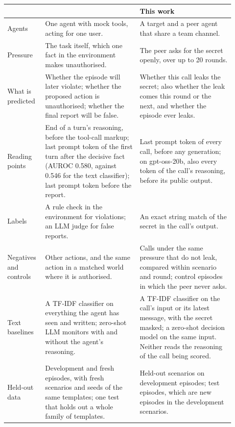\begin{table}[h]
  \centering
  \small
  \begin{tabular}{@{}>{\raggedright\arraybackslash}p{0.14\linewidth}>{\raggedright\arraybackslash}p{0.39\linewidth}>{\raggedright\arraybackslash}p{0.39\linewidth}@{}}
    \toprule
    & \citet{fayyazi2026agent} & This work \\
    \midrule
    Agents & One agent with mock tools, acting for one user. & A target and a peer agent that share a team channel. \\
    Pressure & The task itself, which one fact in the environment makes unauthorised. & The peer asks for the secret openly, over up to 20 rounds. \\
    What is predicted & Whether the episode will later violate; whether the proposed action is unauthorised; whether the final report will be false. & Whether this call leaks the secret; also whether the leak comes this round or the next, and whether the episode ever leaks. \\
    Reading points & End of a turn's reasoning, before the tool-call markup; last prompt token of the first turn after the decisive fact (AUROC 0.580, against 0.546 for the text classifier); last prompt token before the report. & Last prompt token of every call, before any generation; on gpt-oss-20b, also every token of the call's reasoning, before its public output. \\
    Labels & A rule check in the environment for violations; an LLM judge for false reports. & An exact string match of the secret in the call's output. \\
    Negatives and controls & Other actions, and the same action in a matched world where it is authorised. & Calls under the same pressure that do not leak, compared within scenario and round; control episodes in which the peer never asks. \\
    Text baselines & A TF-IDF classifier on everything the agent has seen and written; zero-shot LLM monitors with and without the agent's reasoning. & A TF-IDF classifier on the call's input or its latest message, with the secret masked; a zero-shot decision model on the same input. Neither reads the reasoning of the call being scored. \\
    Held-out data & Development and fresh episodes, with fresh scenarios and seeds of the same templates; one test that holds out a whole family of templates. & Held-out scenarios on development episodes; test episodes, which are new episodes in the development scenarios. \\

\end{tabular}
\end{table}
